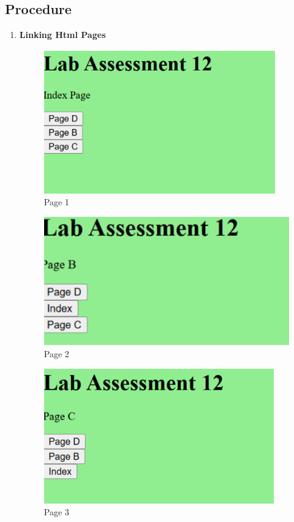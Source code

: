 \documentclass[a4paper,9pt]{article}
\begin{document}
\subsection{Procedure}
\begin{enumerate}
	\item \textbf{Linking Html Pages}
	
	\begin{figure}[H]
		\centering
		\includegraphics[width=0.8\linewidth]{10.1.png}
		\caption{Page 1 }
	\end{figure}
	\begin{figure}[H]
		\centering
		\includegraphics[width=0.8\linewidth]{10.2.png}
		\caption{Page 2}
	\end{figure}
	
	\begin{figure}[H]
		\centering
		\includegraphics[width=0.8\linewidth]{10.3.png}
		\caption{Page 3}
	\end{figure}
	

\end{enumerate}
\end{document}
